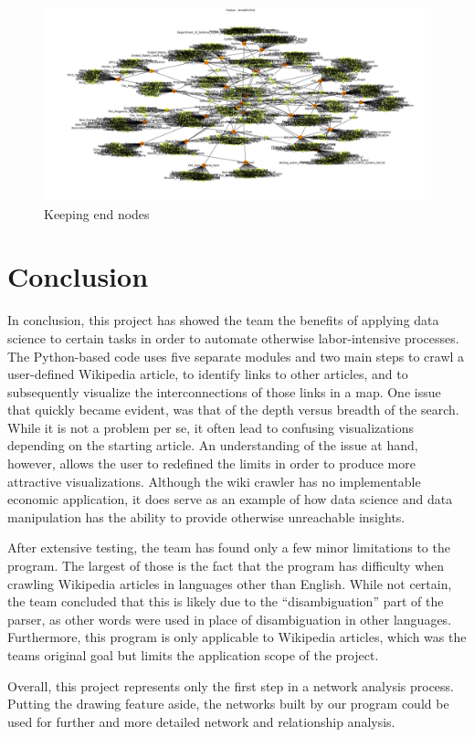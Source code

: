 \documentclass[10pt]{article}
\begin{document}
	\vspace{2.2cm}
	
		\begin{figure}[H]	
			\includegraphics[width=\textwidth]{figure3.png}
   			  	\centering
  			  	\caption{Keeping end nodes}
		\end{figure}

	
\newpage	
\section{Conclusion}

In conclusion, this project has showed the team the benefits of applying data science to certain tasks in order to automate otherwise labor-intensive processes. The Python-based code uses five separate modules and two main steps to crawl a user-defined Wikipedia article, to identify links to other articles, and to subsequently visualize the interconnections of those links in a map. One issue that quickly became evident, was that of the depth versus breadth of the search. While it is not a problem per se, it often lead to confusing visualizations depending on the starting article. An understanding of the issue at hand, however, allows the user to redefined the limits in order to produce more attractive visualizations. Although the wiki crawler has no implementable economic application, it does serve as an example of how data science and data manipulation has the ability to provide otherwise unreachable insights.
\par \noindent
After extensive testing, the team has found only a few minor limitations to the program. The largest of those is the fact that the program has difficulty when crawling Wikipedia articles in languages other than English. While not certain, the team concluded that this is likely due to the ``disambiguation'' part of the parser, as other words were used in place of disambiguation in other languages. Furthermore, this program is only applicable to Wikipedia articles, which was the teams original goal but limits the application scope of the project.
\par \noindent
Overall, this project represents only the first step in a network analysis process. Putting the drawing feature aside, the networks built by our program could be used for further and more detailed network and relationship analysis.



\newpage
 
\newpage

\end{document}
